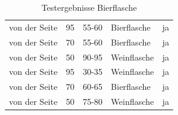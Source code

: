 \begin{table} [H]
\begin{tabular} {l l l l l}
		von der Seite&	95&	55-60&	Bierflasche\cellcolor{green}&ja\cellcolor{green}\\
		von der Seite&	70&	55-60&	Bierflasche\cellcolor{green}&ja\cellcolor{green}\\
		von der Seite&	50&	90-95&	Weinflasche\cellcolor{red}&ja\cellcolor{green}\\
		von der Seite&	95&	30-35&	Weinflasche\cellcolor{red}&ja\cellcolor{green}\\
		von der Seite&	70&	60-65&	Bierflasche\cellcolor{green}&ja\cellcolor{green}\\
		von der Seite&	50&	75-80&	Weinflasche\cellcolor{red}&ja\cellcolor{green}\\
	\end{tabular}
	\caption{Testergebnisse Bierflasche}
	\label{Bier}
\end{table}


